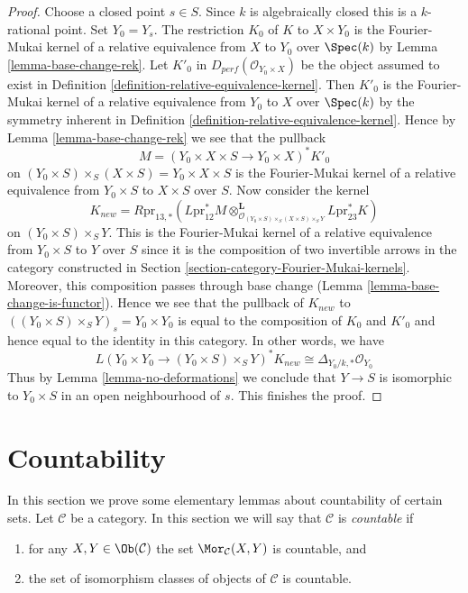 \begin{proof}
Choose a closed point $s \in S$. Since $k$ is algebraically closed
this is a $k$-rational point. Set $Y_0 = Y_s$. The restriction
$K_0$ of $K$ to $X \times Y_0$ is the Fourier-Mukai kernel of a
relative equivalence from $X$ to $Y_0$ over $\Spec(k)$ by
Lemma \ref{lemma-base-change-rek}. Let $K'_0$ in
$D_{perf}(\mathcal{O}_{Y_0 \times X})$ be the 
object assumed to
exist in Definition \ref{definition-relative-equivalence-kernel}.
Then $K'_0$ is the Fourier-Mukai kernel of a
relative equivalence from $Y_0$ to $X$ over $\Spec(k)$
by the symmetry inherent in
Definition \ref{definition-relative-equivalence-kernel}.
Hence by
Lemma \ref{lemma-base-change-rek}
we see that the pullback
$$
M = (Y_0 \times X \times S \to Y_0 \times X)^*K'_0
$$
on $(Y_0 \times S) \times_S (X \times S) = Y_0 \times X \times S$
is the Fourier-Mukai kernel of a
relative equivalence from $Y_0 \times S$ to $X \times S$ over $S$.
Now consider the kernel
$$
K_{new} =
R\text{pr}_{13, *}(L\text{pr}_{12}^*M
\otimes_{\mathcal{O}_{(Y_0 \times S) \times_S (X \times S)
\times_S Y}}^\mathbf{L}
L\text{pr}_{23}^*K)
$$
on $(Y_0 \times S) \times_S Y$. This is the Fourier-Mukai kernel of a
relative equivalence from $Y_0 \times S$ to $Y$ over $S$ since it is
the composition of two invertible arrows in
the category constructed in
Section \ref{section-category-Fourier-Mukai-kernels}.
Moreover, this composition passes through base change
(Lemma \ref{lemma-base-change-is-functor}).
Hence we see that the pullback of $K_{new}$ to
$((Y_0 \times S) \times_S Y)_s = Y_0 \times Y_0$
is equal to the composition of $K_0$ and $K'_0$
and hence equal to the identity in this category.
In other words, we have
$$
L(Y_0 \times Y_0 \to (Y_0 \times S) \times_S Y)^*K_{new}
\cong
\Delta_{Y_0/k, *}\mathcal{O}_{Y_0}
$$
Thus by Lemma \ref{lemma-no-deformations} we conclude that $Y \to S$
is isomorphic to $Y_0 \times S$ in an open neighbourhood of $s$.
This finishes the proof.
\end{proof}






\section{Countability}
\label{section-countability}

\noindent
In this section we prove some elementary lemmas about countability
of certain sets. Let $\mathcal{C}$ be a category. In this section
we will say that $\mathcal{C}$ is {\it countable} if
\begin{enumerate}
\item for any $X, Y \in \Ob(\mathcal{C})$ the set
$\Mor_\mathcal{C}(X, Y)$ is countable, and
\item the set of isomorphism classes of objects of $\mathcal{C}$
is countable.
\end{enumerate}

